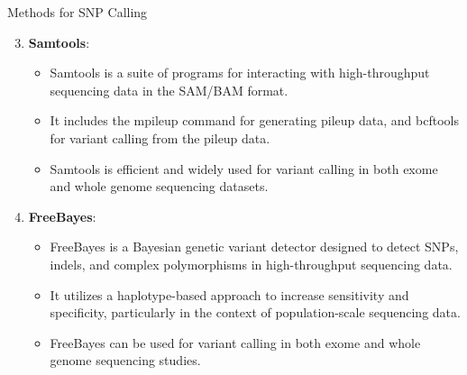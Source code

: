 \documentclass[
  ignorenonframetext,
]{beamer}
\providecommand{\tightlist}{%
  \setlength{\itemsep}{0pt}\setlength{\parskip}{0pt}}
\begin{document}
\begin{frame}{Methods for SNP Calling}
\label{methods-for-snp-calling-1}
\Large

\begin{enumerate}
\setcounter{enumi}{2}
\tightlist
\item
  \textbf{Samtools}:

  \begin{itemize}
  \tightlist
  \item
    Samtools is a suite of programs for interacting with high-throughput
    sequencing data in the SAM/BAM format.
  \item
    It includes the mpileup command for generating pileup data, and
    bcftools for variant calling from the pileup data.
  \item
    Samtools is efficient and widely used for variant calling in both
    exome and whole genome sequencing datasets.
  \end{itemize}
\item
  \textbf{FreeBayes}:

  \begin{itemize}
  \tightlist
  \item
    FreeBayes is a Bayesian genetic variant detector designed to detect
    SNPs, indels, and complex polymorphisms in high-throughput
    sequencing data.
  \item
    It utilizes a haplotype-based approach to increase sensitivity and
    specificity, particularly in the context of population-scale
    sequencing data.
  \item
    FreeBayes can be used for variant calling in both exome and whole
    genome sequencing studies.
  \end{itemize}
\end{enumerate}
\end{frame}
\end{document}
